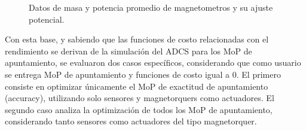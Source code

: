 \begin{figure}[h!]
	\centering
	\begin{subfigure}[t]{0.6\textwidth}
	\end{subfigure}
	\begin{subfigure}[t]{0.6\textwidth}
	\end{subfigure}
	\caption{Datos de masa y potencia promedio de magnetometros y su ajuste potencial.}\label{fig:magn_aj}
\end{figure}

Con esta base, y sabiendo que las funciones de costo relacionadas con el rendimiento se derivan de la simulación del ADCS para los MoP de apuntamiento, se evaluaron dos casos específicos, considerando que como usuario se entrega MoP de apuntamiento y funciones de costo igual a 0. El primero consiste en optimizar únicamente el MoP de exactitud de apuntamiento (accuracy), utilizando solo sensores y magnetorquers como actuadores. El segundo caso analiza la optimización de todos los MoP de apuntamiento, considerando tanto sensores como actuadores del tipo magnetorquer.

